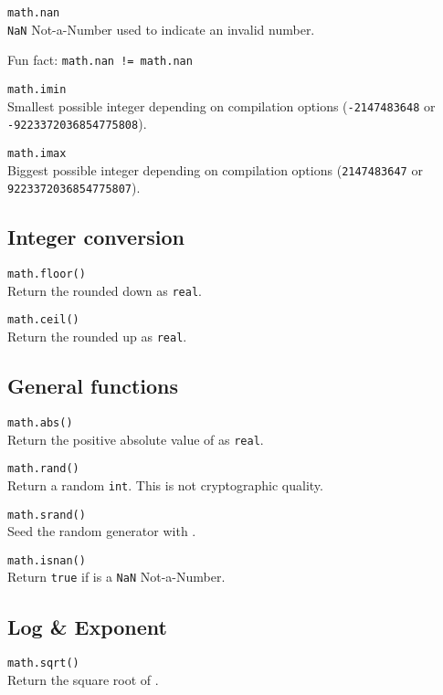 \hangpar \texttt{math.nan}\\
\texttt{NaN} Not-a-Number used to indicate an invalid number.

Fun fact: \texttt{math.nan != math.nan}

\hangpar \texttt{math.imin}\\
Smallest possible integer depending on compilation options (\texttt{-2147483648} or \texttt{-9223372036854775808}).

\hangpar \texttt{math.imax}\\
Biggest possible integer depending on compilation options (\texttt{2147483647} or \texttt{9223372036854775807}).

\subsection*{Integer conversion}

\hangpar \texttt{math.floor(}\texttt{)} \\
Return the rounded down  as \texttt{real}.

\hangpar \texttt{math.ceil(}\texttt{)} \\
Return the rounded up  as \texttt{real}.

\subsection*{General functions}

\hangpar \texttt{math.abs(}\texttt{)} \\
Return the positive absolute value of  as \texttt{real}.

\hangpar \texttt{math.rand()} \\
Return a random \texttt{int}. This is not cryptographic quality.

\hangpar \texttt{math.srand(}\texttt{)} \\
Seed the random generator with .

\hangpar \texttt{math.isnan(}\texttt{)} \\
Return \texttt{true} if  is a \texttt{NaN} Not-a-Number.

\subsection*{Log \& Exponent}

\hangpar \texttt{math.sqrt(}\texttt{)}\\
Return the square root of .


